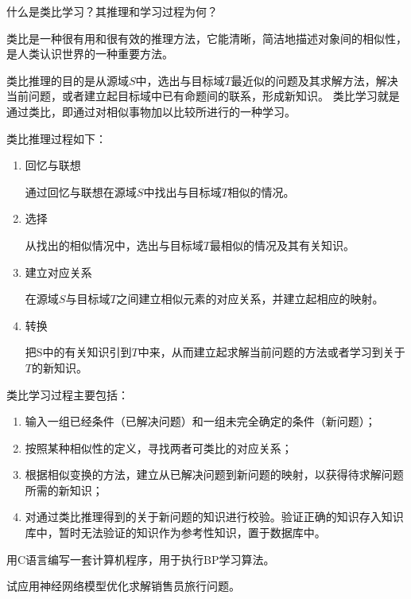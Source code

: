 \begin{question}
什么是类比学习？其推理和学习过程为何？
\end{question}
\begin{solution}
类比是一种很有用和很有效的推理方法，它能清晰，简洁地描述对象间的相似性，是人类认识世界的一种重要方法。\par
类比推理的目的是从源域$S$中，选出与目标域$T$最近似的问题及其求解方法，解决当前问题，或者建立起目标域中已有命题间的联系，形成新知识。 
类比学习就是通过类比，即通过对相似事物加以比较所进行的一种学习。\par
类比推理过程如下：
	\begin{enumerate}
		\item 回忆与联想 \par
		通过回忆与联想在源域$S$中找出与目标域$T$相似的情况。 
		\item 选择 \par
		从找出的相似情况中，选出与目标域$T$最相似的情况及其有关知识。 
		\item 建立对应关系 \par
		在源域$S$与目标域$T$之间建立相似元素的对应关系，并建立起相应的映射。 
		\item 转换 \par
		把S中的有关知识引到$T$中来，从而建立起求解当前问题的方法或者学习到关于$T$的新知识。 
	\end{enumerate} \par
类比学习过程主要包括： 
	\begin{enumerate}
		\item 输入一组已经条件（已解决问题）和一组未完全确定的条件（新问题）；
		\item 按照某种相似性的定义，寻找两者可类比的对应关系；
		\item 根据相似变换的方法，建立从已解决问题到新问题的映射，以获得待求解问题所需的新知识；
		\item 对通过类比推理得到的关于新问题的知识进行校验。验证正确的知识存入知识库中，暂时无法验证的知识作为参考性知识，置于数据库中。
	\end{enumerate}
\end{solution}

\begin{question}
用C语言编写一套计算机程序，用于执行BP学习算法。
\end{question}
\begin{solution}
\end{solution}

\begin{question}
试应用神经网络模型优化求解销售员旅行问题。
\end{question}
\begin{solution}
\end{solution}

